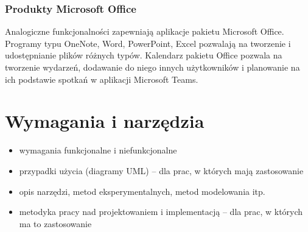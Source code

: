 \documentclass[a4paper,twoside,12pt]{book}
\newtheorem{Definition}{Definicja}
\newtheorem{Example}{Przykład}
\newtheorem{Theorem}{Twierdzenie}
\begin{document}
\subsection{Produkty Microsoft Office}
Analogiczne funkcjonalności zapewniają aplikacje pakietu Microsoft Office. Programy typu OneNote, Word, PowerPoint, Excel pozwalają na tworzenie i udostępnianie plików różnych typów. Kalendarz pakietu Office pozwala na tworzenie wydarzeń, dodawanie do niego innych użytkowników i planowanie na ich podstawie spotkań w aplikacji Microsoft Teams.




%
%



 

\chapter{Wymagania i narzędzia}
\label{ch:wymagania-i-narzedzia}

\begin{itemize}
\item wymagania funkcjonalne i niefunkcjonalne
\item przypadki użycia (diagramy UML) -- dla prac, w których mają zastosowanie
\item opis narzędzi, metod eksperymentalnych, metod modelowania itp.
\item metodyka pracy nad projektowaniem i implementacją -- dla prac, w których ma to zastosowanie
\end{itemize}
\end{document}
